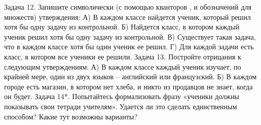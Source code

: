 \documentclass[a4paper,11pt]{article}
\begin{document}
Задача 12. Запишите символически (с помощью кванторов  ,   и обозначений для множеств) утверждения:
А) В каждом классе найдется ученик, который решил хотя бы одну задачу из контрольной.
Б) Найдется класс, в котором каждый ученик решил хотя бы одну задачу из контрольной.
В) Существует такая задача, что в каждом классе хотя бы один ученик ее решил.
Г) Для каждой задачи есть класс, в котором все ученики ее решили.
Задача 13. Постройте отрицания к следующим утверждениям:
А) В каждом классе каждый ученик изучает, по крайней мере, один из двух языков – английский или французский.
Б) В каждом городе есть магазин, в котором нет хлеба, и никто из продавцов не знает, когда он будет.
Задача 14*. Попытайтесь формализовать фразу «ученики должны показывать свои тетради учителям». Удается ли это сделать единственным способом? Какие тут возможны варианты?


\end{document}
